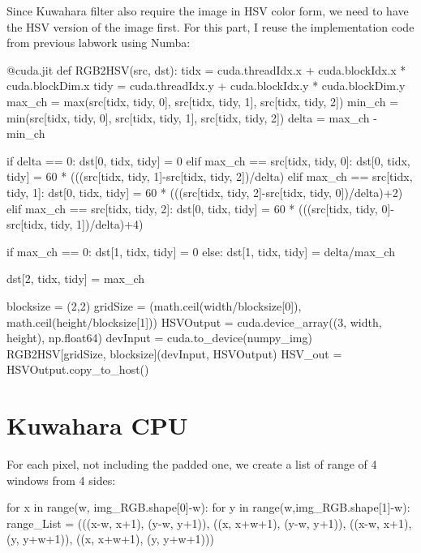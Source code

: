 \documentclass{article}
\begin{document}
Since Kuwahara filter also require the image in HSV color form, we need to have the HSV version of the image first. For this part, I reuse the implementation code from previous labwork using Numba:

\begin{python}
    @cuda.jit
def RGB2HSV(src, dst):
    tidx = cuda.threadIdx.x + cuda.blockIdx.x * cuda.blockDim.x
    tidy = cuda.threadIdx.y + cuda.blockIdx.y * cuda.blockDim.y
    max_ch = max(src[tidx, tidy, 0], src[tidx, tidy, 1], src[tidx, tidy, 2])
    min_ch = min(src[tidx, tidy, 0], src[tidx, tidy, 1], src[tidx, tidy, 2])
    delta = max_ch - min_ch

    if delta == 0:
        dst[0, tidx, tidy] = 0
    elif max_ch == src[tidx, tidy, 0]:
        dst[0, tidx, tidy] = 60 * (((src[tidx, tidy, 1]-src[tidx, tidy, 2])/delta) %
    elif max_ch == src[tidx, tidy, 1]:
        dst[0, tidx, tidy] = 60 * (((src[tidx, tidy, 2]-src[tidx, tidy, 0])/delta)+2)
    elif max_ch == src[tidx, tidy, 2]:
        dst[0, tidx, tidy] = 60 * (((src[tidx, tidy, 0]-src[tidx, tidy, 1])/delta)+4)

    if max_ch == 0:
        dst[1, tidx, tidy] = 0
    else:
        dst[1, tidx, tidy] = delta/max_ch

    dst[2, tidx, tidy] = max_ch
\end{python}

\begin{python}
blocksize = (2,2)
gridSize = (math.ceil(width/blocksize[0]), math.ceil(height/blocksize[1]))
HSVOutput = cuda.device_array((3, width, height), np.float64)
devInput = cuda.to_device(numpy_img)
RGB2HSV[gridSize, blocksize](devInput, HSVOutput)
HSV_out = HSVOutput.copy_to_host()
\end{python}

\section{Kuwahara CPU}
For each pixel, not including the padded one, we create a list of range of 4 windows from 4 sides:
\begin{python}
    for x in range(w, img_RGB.shape[0]-w):
        for y in range(w,img_RGB.shape[1]-w):
            range_List = (((x-w, x+1), (y-w, y+1)),
                        ((x, x+w+1), (y-w, y+1)),
                        ((x-w, x+1), (y, y+w+1)),
                        ((x, x+w+1), (y, y+w+1)))
\end{python}
\end{document}
